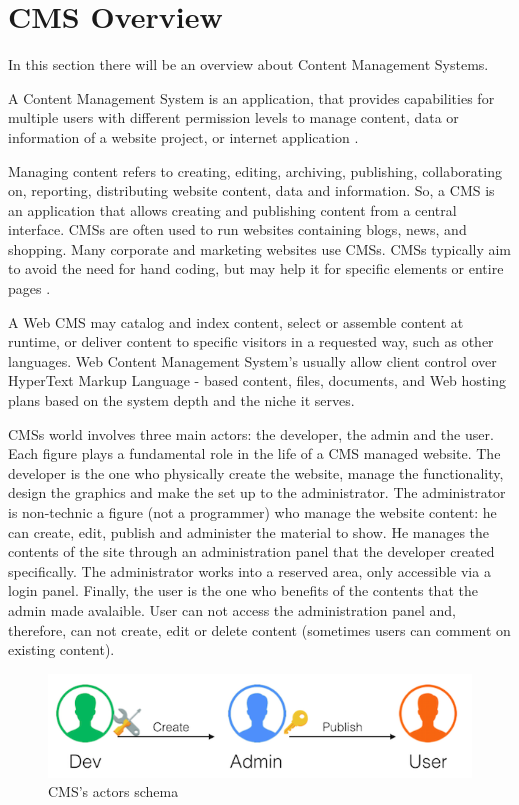 \section{CMS Overview}
\label{sec:CMS_overview}

In this section there will be an overview about Content Management Systems.

A Content Management System is an application, that provides capabilities for multiple users with different permission levels to manage content, data or information of a website project, or internet application \cite{cms_def}.

Managing content refers to creating, editing, archiving, publishing, collaborating on, reporting, distributing website content, data and information.
So, a CMS is an application that allows creating and publishing content from a central interface. CMSs are often used to run websites containing blogs, news, and shopping. Many corporate and marketing websites use CMSs. CMSs typically aim to avoid the need for hand coding, but may help it for specific elements or entire pages \cite{cms_over}. 

A Web CMS may catalog and index content, select or assemble content at runtime, or deliver content to specific visitors in a requested way, such as other languages. Web Content Management System's usually allow client control over HyperText Markup Language - based content, files, documents, and Web hosting plans based on the system depth and the niche it serves.


CMSs world involves three main actors: the developer, the admin and the user. Each figure plays a fundamental role in the life of a CMS managed website. The developer is the one who physically create the website, manage the functionality, design the graphics and make the set up to the administrator.
The administrator is non-technic a figure (not a programmer) who manage the website content: he can create, edit, publish and administer the material to show.
He manages the contents of the site through an administration panel that the developer created specifically. The administrator works into a reserved area, only accessible via a login panel.
Finally, the user is the one who benefits of the contents that the admin made avalaible. User can not access the administration panel and, therefore, can not create, edit or delete content (sometimes users can comment on existing content).

\begin {figure}[h]
\graphicspath{{images/chapter_cms/}}
\includegraphics[width=\textwidth]{cms_schema}
\caption{CMS's actors schema}
\end {figure}


